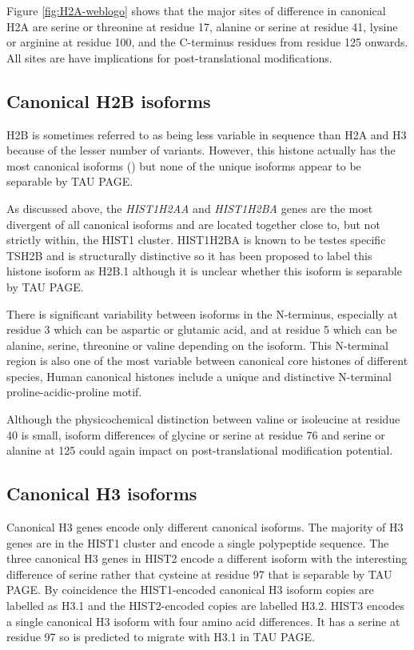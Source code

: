 	Figure \ref{fig:H2A-weblogo} shows that the major sites of difference in canonical H2A are 
	serine or threonine at residue 17, 
	alanine or serine at residue 41, 
	lysine or arginine at residue 100, 
	and the C-terminus residues from residue 125 onwards. 
	All sites are have implications for post-translational modifications. 
	
  \subsection{Canonical H2B isoforms}

	H2B is sometimes referred to as being less variable in sequence than H2A and H3 
	because of the lesser number of variants.
	However, this histone actually has the most canonical isoforms () 
	but none of the \HTwoBUniqueProteins{} unique isoforms appear to be separable by TAU PAGE. 

	As discussed above, the \textit{HIST1H2AA} and \textit{HIST1H2BA} genes 
	are the most divergent of all canonical isoforms 
	and are located together close to, but not strictly within, the HIST1 cluster. 
	HIST1H2BA is known to be testes specific TSH2B 
	and is structurally distinctive  
	so it has been proposed to label this histone isoform as H2B.1  
	although it is unclear whether this isoform is separable by TAU PAGE.
	
	There is significant variability between isoforms in the N-terminus, 
	especially at residue 3 which can be aspartic or glutamic acid, 
	and at residue 5 which can be alanine, serine, threonine or valine depending on the isoform. 
	This N-terminal region is also one of the most variable between canonical core histones of different species,
	Human canonical histones include a unique and distinctive N-terminal proline-acidic-proline motif. 

	Although the physicochemical distinction between valine or isoleucine at residue 40 is small, 
	isoform differences of glycine or serine at residue 76 
	and serine or alanine at 125 could again impact on post-translational modification potential.
	
  \subsection{Canonical H3 isoforms}
	
	Canonical H3 genes encode only \HThreeUniqueProteins{} different canonical isoforms. 
	The majority of H3 genes are in the HIST1 cluster and encode a single polypeptide sequence. 
	The three canonical H3 genes in HIST2 encode a different isoform 
	with the interesting difference of serine rather that cysteine at residue 97 
	that is separable by TAU PAGE.
	By coincidence the HIST1-encoded canonical H3 isoform copies are labelled as H3.1 
	and the HIST2-encoded copies are labelled H3.2.
	HIST3 encodes a single canonical H3 isoform with four amino acid differences. 
	It has a serine at residue 97 so is predicted to migrate with H3.1 in TAU PAGE.
	

